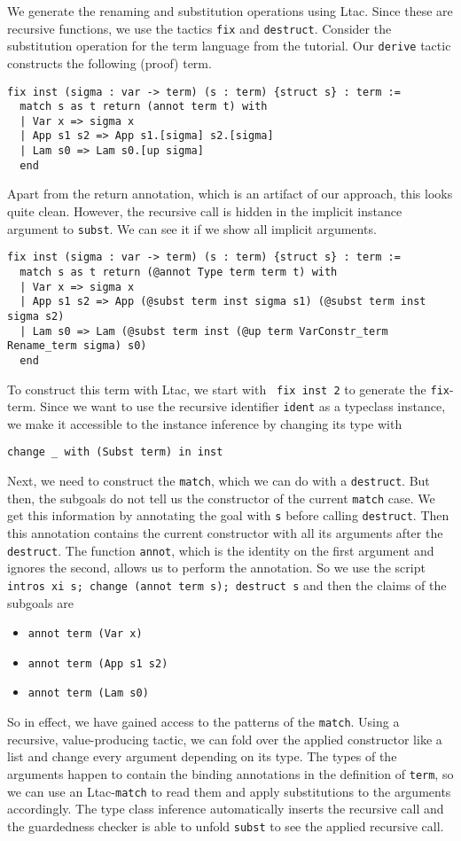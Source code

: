 \documentclass{scrartcl}
\newcommand{\lst}{\lstinline}
\begin{document}
We generate the renaming and substitution operations using Ltac. Since these are recursive functions, we use the tactics \lst$fix$ and \lst$destruct$. Consider the substitution operation for the term language from the tutorial. Our \lst$derive$ tactic constructs the following (proof) term.
\begin{lstlisting}
fix inst (sigma : var -> term) (s : term) {struct s} : term :=
  match s as t return (annot term t) with
  | Var x => sigma x
  | App s1 s2 => App s1.[sigma] s2.[sigma]
  | Lam s0 => Lam s0.[up sigma]
  end
\end{lstlisting}
Apart from the return annotation, which is an artifact of our approach, this looks quite clean. However, the recursive call is hidden in the implicit instance argument to \lst$subst$. We can see it if we show all implicit arguments.
\begin{lstlisting}
fix inst (sigma : var -> term) (s : term) {struct s} : term :=
  match s as t return (@annot Type term term t) with
  | Var x => sigma x
  | App s1 s2 => App (@subst term inst sigma s1) (@subst term inst sigma s2)
  | Lam s0 => Lam (@subst term inst (@up term VarConstr_term Rename_term sigma) s0)
  end
\end{lstlisting}

To construct this term with Ltac, we start with \lst$ fix inst 2$ to generate the \lst$fix$-term. Since we want to use the recursive identifier \lst$ident$ as a typeclass instance, we make it accessible to the instance inference by changing its type with 
\begin{lstlisting}
change _ with (Subst term) in inst  
\end{lstlisting}

Next, we need to construct the \lst$match$, which we can do with a \lst$destruct$. But then, the subgoals do not tell us the constructor of the current \lst$match$ case.
We get this information by annotating the goal with \lst$s$ before calling \lst$destruct$. Then this annotation contains the current constructor with all its arguments after the \lst$destruct$.
The function \lst$annot$, which is the identity on the first argument and ignores the second, allows us to perform the annotation. So we use the script \lst$intros xi s; change (annot term s); destruct s$
and then the claims of the subgoals are
\begin{itemize}
\item \lst$annot term (Var x)$
\item \lst$annot term (App s1 s2)$
\item \lst$annot term (Lam s0)$
\end{itemize}
So in effect, we have gained access to the patterns of the \lst$match$. Using a recursive, value-producing tactic, we can fold over the applied constructor like a list and change every argument depending on its type. The types of the arguments happen to contain the binding annotations in the definition of \lst$term$, so we can use an Ltac-\lst$match$ to read them and apply substitutions to the arguments accordingly. The type class inference automatically inserts the recursive call and the guardedness checker is able to unfold \lst$subst$ to see the applied recursive call.  
\end{document}
